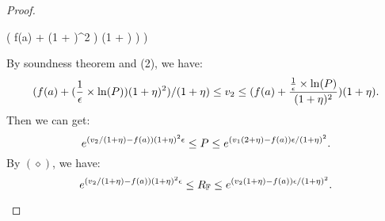 \documentclass[a4paper,11pt]{article}
\begin{document}
\begin{proof}
\begin{itemize}
{\begin{mathpar}
{				%
				(
				f(a) + 
				{(1 + \eta)^2}
				)
				{(1 + \eta)}
				 \big)
				\bigg)
		}
		\end{mathpar}
}	
		By soundness theorem and (2), we have:
		$$(f(a) + 
				(\frac{1}{\epsilon} \times \ln(P))
				(1 + \eta)^2)/
				{(1 + \eta)}
		\leq v_2 \leq 
		(
		f(a) + \frac{\frac{1}{\epsilon} \times \ln(P)}
		{(1 + \eta)^2}){(1 + \eta)}.
		$$ 
		Then we can get:
		\\
		$$e^{(v_2 / (1 + \eta) - f(a))(1 + \eta)^2\epsilon}
		\leq P \leq 
		e^{(v_1 (2 + \eta) - f(a))\epsilon/(1 + \eta)^2}.$$
		By $(\diamond)$, we have:
		\\
		$$e^{(v_2 / (1 + \eta) - f(a))(1 + \eta)^2\epsilon}
		\leq R_{\mathbb{F}} \leq 
		e^{(v_2 (1 + \eta) - f(a))\epsilon/(1 + \eta)^2}.$$


\end{itemize}
\end{proof}
\end{document}
